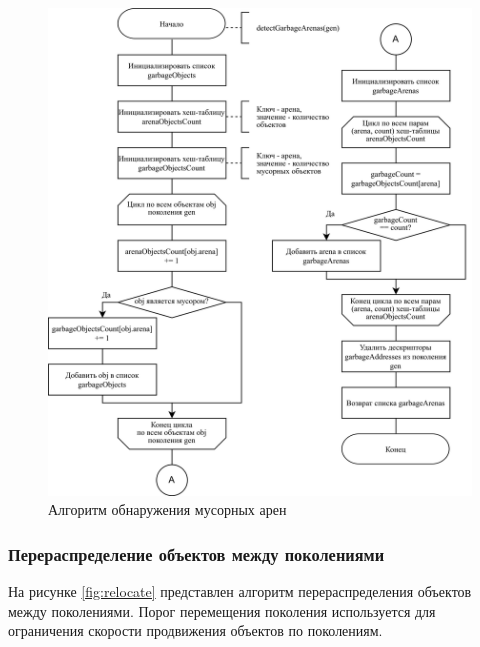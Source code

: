 \begin{figure}[H]
	\centering
	\includegraphics[width=\textwidth]{assets/sweep-2.png}
	\caption{Алгоритм обнаружения мусорных арен}
	\label{fig:sweep-2}
\end{figure}

%

\subsubsection{Перераспределение объектов между поколениями}

На рисунке \ref{fig:relocate} представлен алгоритм перераспределения объектов между поколениями. Порог перемещения поколения используется для ограничения скорости продвижения объектов по поколениям.


